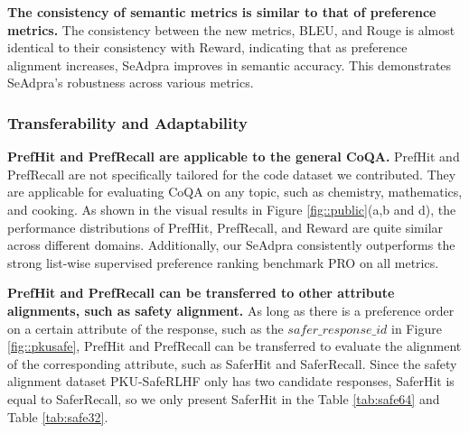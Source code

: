 \textbf{The consistency of semantic metrics is similar to that of preference metrics.}  
The consistency between the new metrics, BLEU, and Rouge is almost identical to their consistency with Reward, indicating that as preference alignment increases, SeAdpra improves in semantic accuracy. This demonstrates SeAdpra's robustness across various metrics.

\subsubsection{Transferability and Adaptability}

\textbf{PrefHit and PrefRecall are applicable to the general CoQA.}
PrefHit and PrefRecall are not specifically tailored for the code dataset we contributed.
They are applicable for evaluating CoQA on any topic, such as chemistry, mathematics, and cooking. 
As shown in the visual results in Figure \ref{fig::public}(a,b and d), the performance distributions of PrefHit, PrefRecall, and Reward are quite similar across different domains. 
Additionally, our SeAdpra consistently outperforms the strong list-wise supervised preference ranking benchmark PRO on all metrics.

\textbf{PrefHit and PrefRecall can be transferred to other attribute alignments, such as safety alignment.}
As long as there is a preference order on a certain attribute of the response, such as the \(safer\_response\_id\) in Figure \ref{fig::pkusafe}, PrefHit and PrefRecall can be transferred to evaluate the alignment of the corresponding attribute, such as SaferHit and SaferRecall. 
Since the safety alignment dataset PKU-SafeRLHF only has two candidate responses, SaferHit is equal to SaferRecall, so we only present SaferHit in the Table \ref{tab:safe64} and Table \ref{tab:safe32}.